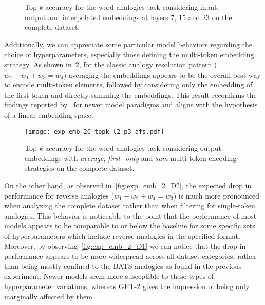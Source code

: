\begin{figure}[t!]
    \centering
    \caption[Top-$k$ accuracy for the word analogies task considering input, output and interpolated embeddings on the complete dataset.]{Top-$k$ accuracy for the word analogies task considering input, output and interpolated embeddings at layers $7$, $15$ and $23$ on the complete dataset.}
    \label{fig:exp_emb_2_B}
\end{figure}

Additionally, we can appreciate some particular model behaviors regarding the choice of hyperparameters, especially those defining the multi-token embedding strategy.
As shown in~\cref{fig:exp_emb_2_C}, for the classic analogy resolution pattern ($w_2 - w_1 + w_3 = w_4$) averaging the embeddings appears to be the overall best way to encode multi-token elements, followed by considering only the embedding of the first token and directly summing the embeddings.
This result reconfirms the findings reported by~\citet{drozd2016} for newer model paradigms and aligns with the hypothesis of a linear embedding space.

\begin{figure}[t!]
    \centering
    \texttt{[image: exp\_emb\_2C\_topk\_l2-p3-afs.pdf]}
    \caption[Top-$k$ accuracy for the word analogies task considering output embeddings with different multi-token encoding strategies on the complete dataset.]{Top-$k$ accuracy for the word analogies task considering output embeddings with \emph{average}, \emph{first\_only} and \emph{sum} multi-token encoding strategies on the complete dataset.}
    \label{fig:exp_emb_2_C}
\end{figure}

On the other hand, as observed in~\cref{fig:exp_emb_2_D2}, the expected drop in performance for reverse analogies ($w_1 - w_2 + w_4 = w_3$) is much more pronounced when analyzing the complete dataset rather than when filtering for single-token analogies.
This behavior is noticeable to the point that the performance of most models appears to be comparable to or below the baseline for some specific sets of hyperparameters which include reverse analogies in the specified format.
Moreover, by observing~\cref{fig:exp_emb_2_D1} we can notice that the drop in performance appears to be more widespread across all dataset categories, rather than being mostly confined to the BATS analogies as found in the previous experiment.
Newer models seem more susceptible to these types of hyperparameter variations, whereas GPT-2 gives the impression of being only marginally affected by them.

